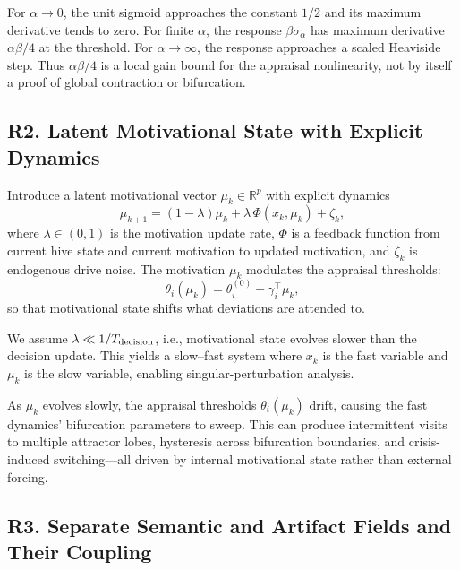 \begin{justification}
For $\alpha\to 0$, the unit sigmoid approaches the constant $1/2$ and its
maximum derivative tends to zero.  For finite $\alpha$, the response
$\beta\sigma_\alpha$ has maximum derivative $\alpha\beta/4$ at the threshold.
For $\alpha\to\infty$, the response approaches a scaled Heaviside step.  Thus
$\alpha\beta/4$ is a local gain bound for the appraisal nonlinearity, not by
itself a proof of global contraction or bifurcation.
\end{justification}

\subsection*{R2. Latent Motivational State with Explicit Dynamics}

\begin{definition}
Introduce a latent motivational vector $\mu_k\in\mathbb R^p$ with explicit
dynamics
\[
  \mu_{k+1}=(1-\lambda)\mu_k+\lambda\,\Phi(x_k,\mu_k)+\zeta_k,
\]
where $\lambda\in(0,1)$ is the motivation update rate, $\Phi$ is a feedback
function from current hive state and current motivation to updated motivation,
and $\zeta_k$ is endogenous drive noise.  The motivation $\mu_k$ modulates the
appraisal thresholds:
\[
  \theta_i(\mu_k)=\theta_i^{(0)}+\gamma_i^\top\mu_k,
\]
so that motivational state shifts what deviations are attended to.
\end{definition}

\begin{assumption}
We assume $\lambda\ll 1/T_{\rm decision}$, i.e., motivational state evolves
slower than the decision update.  This yields a slow--fast system where $x_k$
is the fast variable and $\mu_k$ is the slow variable, enabling
singular-perturbation analysis.
\end{assumption}

\begin{proposition}
As $\mu_k$ evolves slowly, the appraisal thresholds $\theta_i(\mu_k)$ drift,
causing the fast dynamics' bifurcation parameters to sweep.  This can produce
intermittent visits to multiple attractor lobes, hysteresis across bifurcation
boundaries, and crisis-induced switching---all driven by internal motivational
state rather than external forcing.
\end{proposition}

\subsection*{R3. Separate Semantic and Artifact Fields and Their Coupling}

